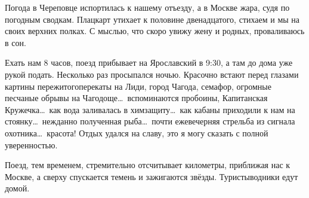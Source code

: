 Погода в Череповце испортилась к нашему отъезду, а в Москве жара, судя по погодным сводкам. Плацкарт утихает к половине двенадцатого, стихаем и мы на своих верхних полках. С мыслью, что скоро увижу жену и родных, проваливаюсь в сон. 

Ехать нам 8 часов, поезд прибывает на Ярославский в 9:30, а там до дома уже рукой подать. Несколько раз просыпался ночью. Красочно встают перед глазами картины пережитого\mdash перекаты на Лиди, город Чагода, семафор, огромные песчаные обрывы на Чагодоще\ldots~вспоминаются пробоины, Капитанская Кружечка\ldots~как вода заливалась в химзащиту\ldots~как кабаны приходили к нам на стоянку\ldots~нежданно полученная рыба\ldots~почти ежевечерняя стрельба из сигнала охотника\ldots~красота! Отдых удался на славу, это я могу сказать с полной уверенностью. 

Поезд, тем временем, стремительно отсчитывает километры, приближая нас к Москве, а сверху спускается темень и зажигаются звёзды. Туристы\sdash водники едут домой.     

\begin{center}
\end{center}